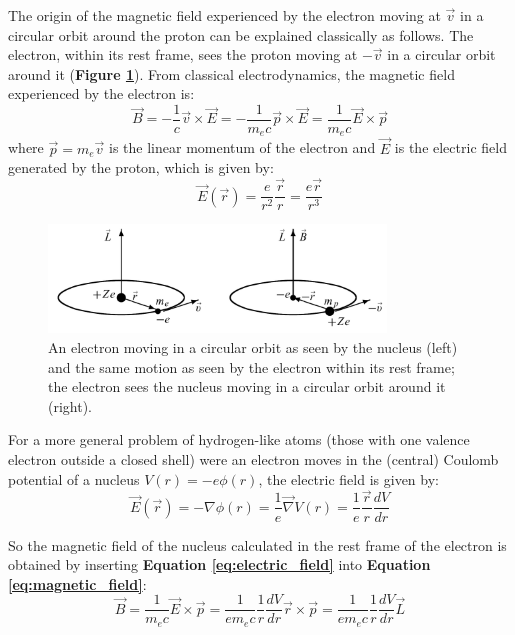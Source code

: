 The origin of the magnetic field experienced by the electron moving at $\vec{v}$ in a circular orbit around the proton can be explained classically as follows. The electron, within its rest frame, sees the proton moving at $-\vec{v}$ in a circular orbit around it (\textbf{Figure \ref{fig:spin_orbit_coupling}}). From classical electrodynamics, the magnetic field experienced by the electron is:
\begin{equation} \label{eq:magnetic_field}
    \vec{B} = -\frac{1}{c}\vec{v}\times \vec{E} = -\frac{1}{m_ec}\vec{p}\times \vec{E} = \frac{1}{m_ec}\vec{E}\times \vec{p}
\end{equation}
where $\vec{p} = m_e\vec{v}$ is the linear momentum of the electron and $\vec{E}$ is the electric field generated by the proton, which is given by:
\begin{equation}
    \vec{E}(\vec{r}) = \frac{e}{r^2}\frac{\vec{r}}{r} = \frac{e\vec{r}}{r^3}
\end{equation}

\begin{figure}[htbp]
    \centering
    \includegraphics[width=0.8\textwidth]{images/spin-orbit-coupling.png}
    \caption{An electron moving in a circular orbit as seen by the nucleus (left) and the same motion as seen by the electron within its rest frame; the electron sees the nucleus moving in a circular orbit around it (right).}
    \label{fig:spin_orbit_coupling}
\end{figure}

For a more general problem of hydrogen-like atoms (those with one valence electron outside a closed shell) were an electron moves in the (central) Coulomb potential of a nucleus $V(r) = -e\phi(r)$, the electric field is given by:
\begin{equation} \label{eq:electric_field}
    \vec{E}(\vec{r}) = -\nabla\phi(r) = \frac{1}{e}\vec{\nabla} V(r) = \frac{1}{e}\frac{\vec{r}}{r}\frac{dV}{dr}
\end{equation}

So the magnetic field of the nucleus calculated in the rest frame of the electron is obtained by inserting \textbf{Equation \ref{eq:electric_field}} into \textbf{Equation \ref{eq:magnetic_field}}:
\begin{equation}
    \vec{B} = \frac{1}{m_ec}\vec{E}\times \vec{p} = \frac{1}{em_ec}\frac{1}{r}\frac{dV}{dr}\vec{r}\times \vec{p} = \frac{1}{em_ec}\frac{1}{r}\frac{dV}{dr}\vec{L}
\end{equation}

